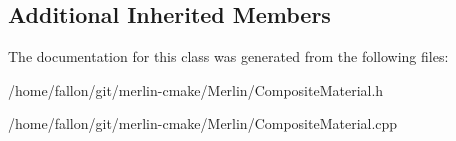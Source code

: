 \subsection*{Additional Inherited Members}


The documentation for this class was generated from the following files\+:\begin{DoxyCompactItemize}
\item 
/home/fallon/git/merlin-\/cmake/\+Merlin/Composite\+Material.\+h\item 
/home/fallon/git/merlin-\/cmake/\+Merlin/Composite\+Material.\+cpp\end{DoxyCompactItemize}
